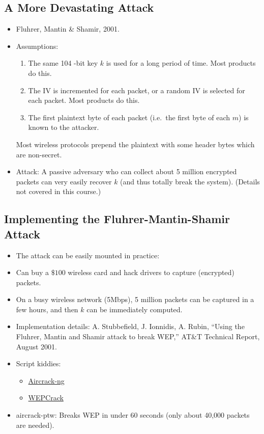\subsection*{A More Devastating Attack}
\begin{itemize}
      \item Fluhrer, Mantin \& Shamir, 2001.
      \item Assumptions:
            \begin{enumerate}
                  \item The same 104 -bit key $k$ is used for a long period of time.
                        Most products do this.
                  \item The IV is incremented for each packet, or a random IV is
                        selected for each packet. Most products do this.
                  \item The first plaintext byte of each packet (i.e.\ the first byte of each $m$)
                        is known to the attacker.
            \end{enumerate}
            Most wireless protocols prepend the plaintext with some header
            bytes which are non-secret.
      \item Attack: A passive adversary who can collect about 5 million
            encrypted packets can very easily recover $k$ (and thus totally break the system).
            (Details not covered in this course.)
\end{itemize}

\subsection*{Implementing the Fluhrer-Mantin-Shamir Attack}
\begin{itemize}
      \item The attack can be easily mounted in practice:
      \item Can buy a $\$ 100$ wireless card and hack drivers to capture (encrypted) packets.
      \item On a busy wireless network (5Mbps), 5 million packets
            can be captured in a few hours, and then $k$ can be immediately computed.
      \item Implementation details: A. Stubbefield, J. Ionnidis, A. Rubin,
            ``Using the Fluhrer, Mantin and Shamir attack to break WEP,'' AT\&T
            Technical Report, August 2001.
      \item Script kiddies:
            \begin{itemize}
                  \item \href{http://www.aircrack-ng.org/doku.php}{Aircrack-ng}
                  \item \href{https://sourceforge.net/projects/wepcrack}{WEPCrack}
            \end{itemize}
      \item aircrack-ptw: Breaks WEP in under 60 seconds
            (only about 40,000 packets are needed).
\end{itemize}

